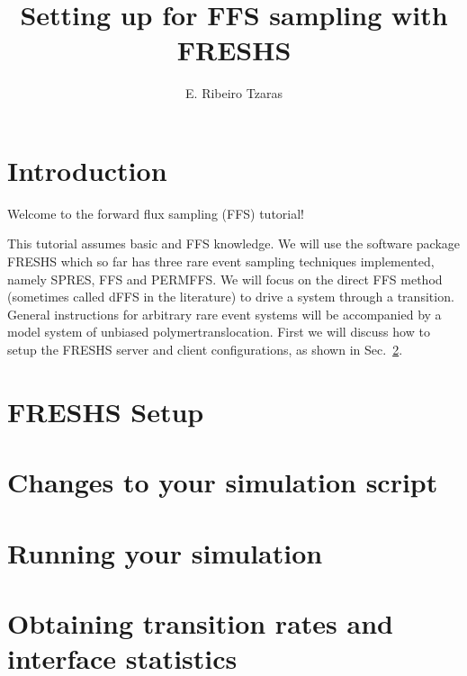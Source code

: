 \documentclass[
paper=a4,                       %
fontsize=11pt,                  %
headinclude=false,              %
footinclude=false,              %
pagesize,                       %
]{scrartcl}
\newcommand{\freshs}{\mbox{\textsf{FRESHS}}\xspace}
\begin{document}
\esptitlehead

\title{Setting up \es{} for FFS sampling with \freshs}

\author{E. Ribeiro Tzaras}

\maketitle

\section{Introduction}

Welcome to the forward flux sampling (FFS) \es{} tutorial!

This tutorial assumes basic \es{} and FFS knowledge. We will use the software package \freshs which so far has three rare event sampling techniques implemented, namely SPRES, FFS and PERMFFS.
We will focus on the direct FFS method (sometimes called dFFS in the literature) to drive a system through a transition.
General instructions for arbitrary rare event systems will be accompanied by a model system of unbiased polymertranslocation.
First we will discuss how to setup the \freshs server and client configurations, as shown in Sec.~\ref{sec:freshs_setup}.

\section{\freshs Setup} \label{sec:freshs_setup}


\section{Changes to your simulation script} \label{sec:simulation_script}


\section{Running your simulation} \label{sec:run_ffs}



\section{Obtaining transition rates and interface statistics} \label{sec:freshs_analysis}
\end{document}
